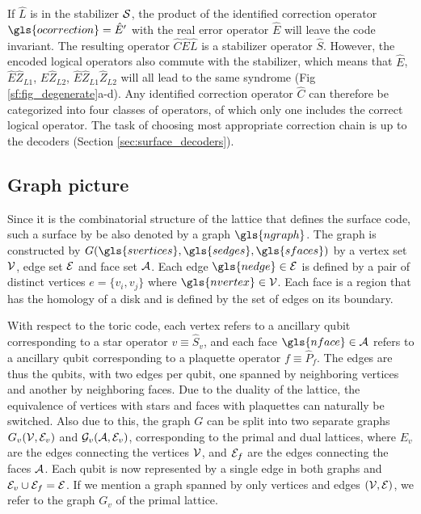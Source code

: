 If $\hat{L}$ is in the stabilizer $\mathcal{S}$, the product of the identified correction operator $\gls{ocorrection}=\hat{E}'$ with the real error operator $\hat{E}$ will leave the code invariant. The resulting operator $\hat{C}\hat{E}\hat{L}$ is a stabilizer operator $\hat{S}$. However, the encoded logical operators also commute with the stabilizer, which means that $\hat{E}$, $\hat{E}\hat{Z}_{L1}$, $\hat{E}\hat{Z}_{L2}$, $\hat{E}\hat{Z}_{L1}\hat{Z}_{L2}$ will all lead to the same syndrome (Fig \ref{sf:fig_degenerate}a-d). Any identified correction operator $\hat{C}$ can therefore be categorized into four classes of operators, of which only one includes the correct logical operator. The task of choosing most appropriate correction chain is up to the decoders (Section \ref{sec:surface_decoders}).

\subsection{Graph picture}\label{sec:toricgraph}
Since it is the combinatorial structure of the lattice that defines the surface code, such a surface by be also denoted by a graph $\gls{ngraph}$. The graph is constructed by $G(\gls{svertices}, \gls{sedges}, \gls{sfaces})$ by a vertex set $\mathcal{V}$, edge set $\mathcal{E}$ and face set $\mathcal{A}$. Each edge $\gls{nedge}\in \m{E}$ is defined by a pair of distinct vertices $e=\{v_i, v_j\}$ where $\gls{nvertex}\in \m{V}$. Each face is a region that has the homology of a disk and is defined by the set of edges on its boundary. 

With respect to the toric code, each vertex refers to a ancillary qubit corresponding to a star operator $v\equiv \hat{S}_v$, and each face $\gls{nface}\in \m{A}$ refers to a ancillary qubit corresponding to a plaquette operator $f\equiv \hat{P}_f$. The edges are thus the qubits, with two edges per qubit, one spanned by neighboring vertices and another by neighboring faces. Due to the duality of the lattice, the equivalence of vertices with stars and faces with plaquettes can naturally be switched. Also due to this, the graph $G$ can be split into two separate graphs $G_v(\mathcal{V}, \mathcal{E}_v)$ and $\mathcal{G}_v(\mathcal{A}, \mathcal{E}_v)$, corresponding to the primal and dual lattices, where $E_v$ are the edges connecting the vertices $\mathcal{V}$, and $\mathcal{E}_f$ are the edges connecting the faces $\mathcal{A}$. Each qubit is now represented by a single edge in both graphs and $\mathcal{E}_v\cup \mathcal{E}_f=\mathcal{E}$. If we mention a graph spanned by only vertices and edges $(\mathcal{V},\mathcal{E})$, we refer to the graph $G_v$ of the primal lattice. 


